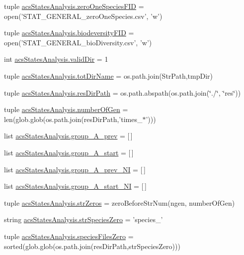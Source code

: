 \begin{DoxyCompactItemize}
\item 
tuple \hyperlink{a00104_a3dc90aca8a97c5995b013887c98d8ce9}{acs\-States\-Analysis.\-zero\-One\-Species\-F\-I\-D} = open('S\-T\-A\-T\-\_\-\-G\-E\-N\-E\-R\-A\-L\-\_\-zero\-One\-Species.\-csv', 'w')
\item 
tuple \hyperlink{a00104_a68c23cb79e89d9e14acf9ed09f46f0e4}{acs\-States\-Analysis.\-biodeversity\-F\-I\-D} = open('S\-T\-A\-T\-\_\-\-G\-E\-N\-E\-R\-A\-L\-\_\-bio\-Diversity.\-csv', 'w')
\item 
int \hyperlink{a00104_aebb18ab2b73e7e2705ee42c728c0a72b}{acs\-States\-Analysis.\-valid\-Dir} = 1
\item 
tuple \hyperlink{a00104_af4bd99f6cdaec32f48ed0074208b4f0c}{acs\-States\-Analysis.\-tot\-Dir\-Name} = os.\-path.\-join(Str\-Path,tmp\-Dir)
\item 
tuple \hyperlink{a00104_ab3da7da39258338965b6eef645a913ee}{acs\-States\-Analysis.\-res\-Dir\-Path} = os.\-path.\-abspath(os.\-path.\-join(\char`\"{}./\char`\"{}, \char`\"{}res\char`\"{}))
\item 
tuple \hyperlink{a00104_a54acb4eba0735e72c2a820383febd37f}{acs\-States\-Analysis.\-number\-Of\-Gen} = len(glob.\-glob(os.\-path.\-join(res\-Dir\-Path,'times\-\_\-$\ast$')))
\item 
list \hyperlink{a00104_a1dd2f2c85f697e454c99be1a157d6c17}{acs\-States\-Analysis.\-group\-\_\-\-A\-\_\-prev} = \mbox{[}$\,$\mbox{]}
\item 
list \hyperlink{a00104_a3898175300d001a17a60c23656d2812f}{acs\-States\-Analysis.\-group\-\_\-\-A\-\_\-start} = \mbox{[}$\,$\mbox{]}
\item 
list \hyperlink{a00104_a4d77133a6a303d9486944707f3310cf8}{acs\-States\-Analysis.\-group\-\_\-\-A\-\_\-prev\-\_\-\-N\-I} = \mbox{[}$\,$\mbox{]}
\item 
list \hyperlink{a00104_aedb746884c5ae6e301c8ad2d8307fe4d}{acs\-States\-Analysis.\-group\-\_\-\-A\-\_\-start\-\_\-\-N\-I} = \mbox{[}$\,$\mbox{]}
\item 
tuple \hyperlink{a00104_a292c23aa303304f24632662a5dfbfa23}{acs\-States\-Analysis.\-str\-Zeros} = zero\-Before\-Str\-Num(ngen, number\-Of\-Gen)
\item 
string \hyperlink{a00104_a52f7239b2be2cb978182547960b6c46e}{acs\-States\-Analysis.\-str\-Species\-Zero} = 'species\-\_\-'
\item 
tuple \hyperlink{a00104_a5584994da277e7798c904342dff18427}{acs\-States\-Analysis.\-species\-Files\-Zero} = sorted(glob.\-glob(os.\-path.\-join(res\-Dir\-Path,str\-Species\-Zero)))
\item 

\end{DoxyCompactItemize}
